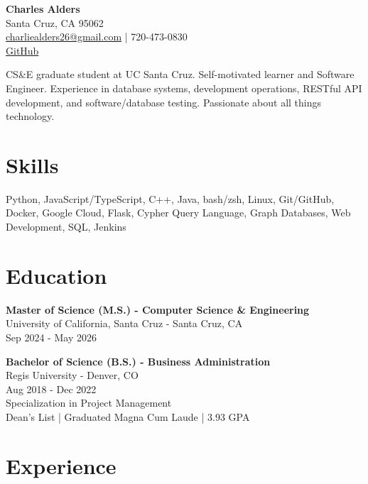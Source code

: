 \documentclass[a4paper,10pt]{article}
\begin{document}
\begin{center}
    {\LARGE \textbf{Charles Alders}} \\
    Santa Cruz, CA 95062 \\
    \href{mailto:charliealders26@gmail.com}{charliealders26@gmail.com} | 720-473-0830 \\
    \href{https://github.com/char26}{GitHub}
\end{center}

\vspace{0.5cm}

\begin{flushleft}
CS\&E graduate student at UC Santa Cruz. Self-motivated learner and Software Engineer. Experience in database systems, development operations, RESTful API development, and software/database testing. Passionate about all things technology.
\end{flushleft}

\section*{Skills}
Python, JavaScript/TypeScript, C++, Java, bash/zsh, Linux, Git/GitHub, Docker, Google Cloud, Flask, Cypher Query Language, Graph Databases, Web Development, SQL, Jenkins

\section*{Education}
\begin{flushleft}
\textbf{Master of Science (M.S.) - Computer Science \& Engineering} \\
University of California, Santa Cruz - Santa Cruz, CA \\
Sep 2024 - May 2026
\end{flushleft}

\begin{flushleft}
\textbf{Bachelor of Science (B.S.) - Business Administration} \\
Regis University - Denver, CO \\
Aug 2018 - Dec 2022 \\
Specialization in Project Management \\
Dean's List | Graduated Magna Cum Laude | 3.93 GPA
\end{flushleft}
\section*{Experience}
\end{document}
